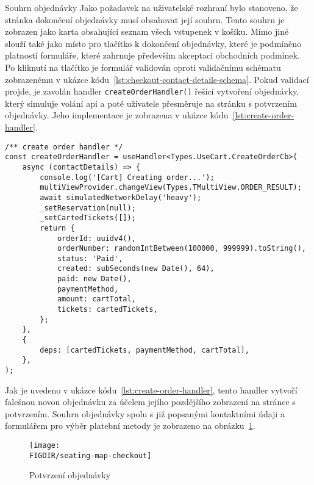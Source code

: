 \begin{subsection}{Souhrn objednávky}
    \label{subsec:implementace-checkout-souhrn}
    Jako požadavek na uživatelské rozhraní bylo stanoveno, že stránka dokončení objednávky musí obsahovat její souhrn.
    Tento souhrn je zobrazen jako karta obsahující seznam všech vstupenek v košíku.
    Mimo jiné slouží také jako místo pro tlačítko k dokončení objednávky, které je podmíněno platností formuláře, které zahrnuje především akceptaci obchodních podmínek.
    Po kliknutí na tlačítko je formulář validován oproti validačnímu schématu zobrazenému v ukázce kódu~\ref{lst:checkout-contact-details-schema}.
    Pokud validací projde, je zavolán handler \texttt{createOrderHandler()} řešící vytvoření objednávky, který simuluje volání \ac{api} a poté uživatele přesměruje na stránku s potvrzením objednávky.
    Jeho implementace je zobrazena v ukázce kódu~\ref{lst:create-order-handler}.

    \begin{listing}[H]
        \begin{verbatim}
/** create order handler */
const createOrderHandler = useHandler<Types.UseCart.CreateOrderCb>(
	async (contactDetails) => {
		console.log('[Cart] Creating order...');
		multiViewProvider.changeView(Types.TMultiView.ORDER_RESULT);
		await simulatedNetworkDelay('heavy');
		_setReservation(null);
		_setCartedTickets([]);
		return {
			orderId: uuidv4(),
			orderNumber: randomIntBetween(100000, 999999).toString(),
			status: 'Paid',
			created: subSeconds(new Date(), 64),
			paid: new Date(),
			paymentMethod,
			amount: cartTotal,
			tickets: cartedTickets,
		};
	},
	{
		deps: [cartedTickets, paymentMethod, cartTotal],
	},
);
        \end{verbatim}
        \caption{Implementace handleru pro vytvoření objednávky}
        \label{lst:create-order-handler}
    \end{listing}

    Jak je uvedeno v ukázce kódu~\ref{lst:create-order-handler}, tento handler vytvoří falešnou novou objednávku za účelem jejího pozdějšího zobrazení na stránce s potvrzením.
    Souhrn objednávky spolu s již popsanými kontaktními údaji a formulářem pro výběr platební metody je zobrazeno na obrázku~\ref{fig:seating-map-checkout}.

    \begin{figure}[H]
        \centering
        \texttt{[image: \\FIGDIR/seating-map-checkout]}
        \caption{Potvrzení objednávky}
        \label{fig:seating-map-checkout}
    \end{figure}
\end{subsection}

